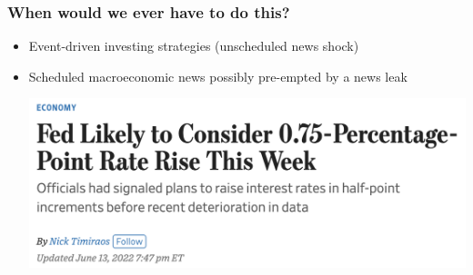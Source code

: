 \documentclass[9pt]{beamer}
\theoremstyle{definition}
\begin{document}
\begin{frame}
    \frametitle{When would we ever have to do this?}

    \begin{itemize}
        \item <1-> Event-driven investing strategies (unscheduled news shock)
        \item <2-> Scheduled macroeconomic news possibly pre-empted by a news leak
        

        \href{https://www.wsj.com/articles/bad-inflation-reports-raise-odds-of-surprise-0-75-percentage-point-rate-rise-this-week-11655147927}{\includegraphics[scale=.3]{WSJ_rate_hike_2022.png}}
    \end{itemize}
\end{frame}
\end{document}
